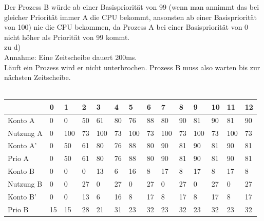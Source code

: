 \documentclass{ti2}
\begin{document}
Der Prozess B würde ab einer Basispriorität von 99 (wenn man annimmt das bei gleicher Priorität immer A die CPU bekommt, ansonsten ab einer Basispriorität von 100) nie die CPU bekommen, da Prozess A bei einer Basispriorität von 0 nicht höher als Priorität von 99 kommt. \\
zu d) \\
Annahme: Eine Zeitscheibe dauert 200ms.\\
Läuft ein Prozess wird er nicht unterbrochen. Prozess B muss also warten bis zur nächsten Zeitscheibe.\\\\
\begin{tabular}[h]{|p{2cm}||p{0.5cm}|p{0.5cm}|p{0.5cm}|p{0.5cm}|p{0.5cm}|p{0.5cm}|p{0.5cm}|p{0.5cm}|p{0.5cm}|p{0.5cm}|p{0.5cm}|p{0.5cm}|p{0.5cm}|}
	\hline
	& 0 & 1 & 2 & 3 & 4 & 5 & 6 & 7 & 8 & 9 & 10 & 11 & 12 \\
	\hline
	\hline
	Konto A & 0 & 0 & 50 & 61 & 80 & 76 & 88 & 80 & 90 & 81 & 90 & 81 & 90 \\
	\hline
	Nutzung A & 0 & 100 & 73 & 100 & 73 & 100 & 73 & 100 & 73 & 100 & 73 & 100 & 73 \\
	\hline
	Konto A'& 0 & 50 & 61 & 80 & 76 & 88 & 80 & 90 & 81 & 90 & 81 & 90 & 81 \\
	\hline
	Prio A & 0 & 50 & 61 & 80 & 76 & 88 & 80 & 90 & 81 & 90 & 81 & 90 & 81 \\
	\hline
	\hline
	Konto B & 0 & 0 & 0 & 13 & 6 & 16 & 8 & 17 & 8 & 17 & 8 & 17 & 8 \\
	\hline
	Nutzung B & 0 & 0 & 27 & 0 & 27 & 0 & 27 & 0 & 27 & 0 & 27 & 0 & 27 \\
	\hline
	Konto B' & 0 & 0 & 13 & 6 & 16 & 8 & 17 & 8 & 17 & 8 & 17 & 8 & 17 \\
	\hline
	Prio B & 15 & 15 & 28 & 21 & 31 & 23 & 32 & 23 & 32 & 23 & 32 & 23 & 32 \\
	\hline
	
\end{tabular}
\end{document}
